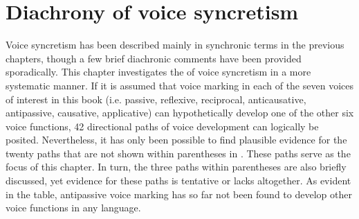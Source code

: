 \chapter{Diachrony of voice syncretism} \label{sec:diachrony}
Voice syncretism has been described mainly in synchronic terms in the previous chapters, though a few brief diachronic comments have been provided sporadically. This chapter investigates the  of voice syncretism in a more systematic manner. If it is assumed that voice marking in each of the seven voices of interest in this book (i.e. passive, reflexive, reciprocal, anticausative, antipassive, causative, applicative) can hypothetically develop one of the other six voice functions, 42 directional paths of voice development can logically be posited. Nevertheless, it has only been possible to find plausible evidence for the twenty paths that are not shown within parentheses in . These paths serve as the focus of this chapter. In turn, the three paths within parentheses are also briefly discussed, yet evidence for these paths is tentative or lacks altogether. As evident in the table, antipassive voice marking has so far not been found to develop other voice functions in any language.

